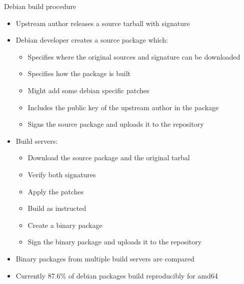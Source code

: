 \documentclass[11pt]{beamer}
\begin{document}
\begin{frame}{Debian build procedure}
\begin{itemize}
\item Upstream author releases a source tarball with signature
\pause
\item Debian developer creates a source package which:
\begin{itemize}
\item Specifies where the original sources and signature can be downloaded
\item Specifies how the package is built
\item Might add some debian specific patches
\item Includes the public key of the upstream author in the package
\item Signs the source package and uploads it to the repository
\end{itemize}
\pause
\item Build servers:
\begin{itemize}
\item Download the source package and the original tarbal
\item Verify both signatures
\item Apply the patches
\item Build as instructed
\item Create a binary package
\item Sign the binary package and uploads it to the repository
\end{itemize}
\pause
\item Binary packages from multiple build servers are compared
\item Currently 87.6\% of debian packages build reproducibly for amd64
\end{itemize}
\end{frame}
\end{document}
